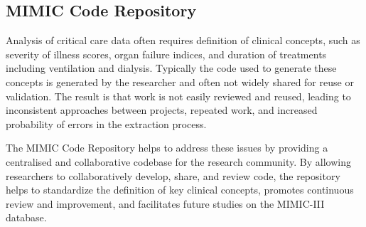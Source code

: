 \documentclass{bioinfo}
\begin{document}







\subsection{MIMIC Code Repository}

Analysis of critical care data often requires definition of clinical concepts, such as severity of illness scores, organ failure indices, and duration of treatments including ventilation and dialysis. Typically the code used to generate these concepts is generated by the researcher and often not widely shared for reuse or validation. The result is that work is not easily reviewed and reused, leading to inconsistent approaches between projects, repeated work, and increased probability of errors in the extraction process. 

The MIMIC Code Repository helps to address these issues by providing a centralised and collaborative codebase for the research community. By allowing researchers to collaboratively develop, share, and review code, the repository helps to standardize the definition of key clinical concepts, promotes continuous review and improvement, and facilitates future studies on the MIMIC-III database. 
\end{document}
